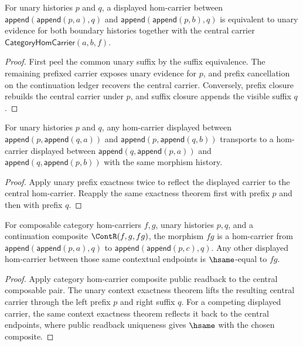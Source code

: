 \begin{theorem}
\label{thm:category-hom-carrier-unary-context-exactness}
For unary histories $p$ and $q$, a displayed hom-carrier between
$\mathsf{append}(\mathsf{append}(p,a),q)$ and
$\mathsf{append}(\mathsf{append}(p,b),q)$ is equivalent to unary evidence for
both boundary histories together with the central carrier
$\mathsf{CategoryHomCarrier}(a,b,f)$.
\end{theorem}
\begin{proof}
First peel the common unary suffix by the suffix equivalence. The remaining
prefixed carrier exposes unary evidence for $p$, and prefix cancellation on
the continuation ledger recovers the central carrier. Conversely, prefix
closure rebuilds the central carrier under $p$, and suffix closure appends the
visible suffix $q$.
\end{proof}

\begin{theorem}
\label{thm:category-hom-carrier-unary-prefix-comm-transport}
For unary histories $p$ and $q$, any hom-carrier displayed between
$\mathsf{append}(p,\mathsf{append}(q,a))$ and
$\mathsf{append}(p,\mathsf{append}(q,b))$ transports to a hom-carrier displayed
between $\mathsf{append}(q,\mathsf{append}(p,a))$ and
$\mathsf{append}(q,\mathsf{append}(p,b))$ with the same morphism history.
\end{theorem}
\begin{proof}
Apply unary prefix exactness twice to reflect the displayed carrier to the
central hom-carrier. Reapply the same exactness theorem first with prefix $p$
and then with prefix $q$.
\end{proof}

\begin{theorem}
\label{thm:category-hom-carrier-unary-context-comp-public-readback}
For composable category hom-carriers $f,g$, unary histories $p,q$, and a
continuation composite $\ContR(f,g,fg)$, the morphism $fg$ is a hom-carrier
from $\mathsf{append}(\mathsf{append}(p,a),q)$ to
$\mathsf{append}(\mathsf{append}(p,c),q)$. Any other displayed hom-carrier
between those same contextual endpoints is $\hsame$-equal to $fg$.
\end{theorem}
\begin{proof}
Apply category hom-carrier composite public readback to the central
composable pair. The unary context exactness theorem lifts the resulting
central carrier through the left prefix $p$ and right suffix $q$. For a
competing displayed carrier, the same context exactness theorem reflects it
back to the central endpoints, where public readback uniqueness gives
$\hsame$ with the chosen composite.
\end{proof}

